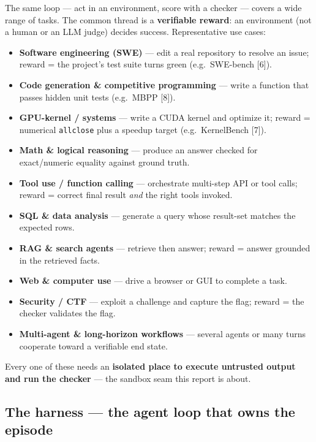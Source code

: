 \documentclass[
  paper=a4,
  ,captions=tableheading
]{scrartcl}
\providecommand{\tightlist}{%
  \setlength{\itemsep}{0pt}\setlength{\parskip}{0pt}}
\begin{document}
The same loop --- act in an environment, score with a checker --- covers
a wide range of tasks. The common thread is a \textbf{verifiable
reward}: an environment (not a human or an LLM judge) decides success.
Representative use cases:

\begin{itemize}
\tightlist
\item
  \textbf{Software engineering (SWE)} --- edit a real repository to
  resolve an issue; reward = the project's test suite turns green
  (e.g.~SWE-bench {[}6{]}).
\item
  \textbf{Code generation \& competitive programming} --- write a
  function that passes hidden unit tests (e.g.~MBPP {[}8{]}).
\item
  \textbf{GPU-kernel / systems} --- write a CUDA kernel and optimize it;
  reward = numerical \texttt{allclose} plus a speedup target
  (e.g.~KernelBench {[}7{]}).
\item
  \textbf{Math \& logical reasoning} --- produce an answer checked for
  exact/numeric equality against ground truth.
\item
  \textbf{Tool use / function calling} --- orchestrate multi-step API or
  tool calls; reward = correct final result \emph{and} the right tools
  invoked.
\item
  \textbf{SQL \& data analysis} --- generate a query whose result-set
  matches the expected rows.
\item
  \textbf{RAG \& search agents} --- retrieve then answer; reward =
  answer grounded in the retrieved facts.
\item
  \textbf{Web \& computer use} --- drive a browser or GUI to complete a
  task.
\item
  \textbf{Security / CTF} --- exploit a challenge and capture the flag;
  reward = the checker validates the flag.
\item
  \textbf{Multi-agent \& long-horizon workflows} --- several agents or
  many turns cooperate toward a verifiable end state.
\end{itemize}

Every one of these needs an \textbf{isolated place to execute untrusted
output and run the checker} --- the sandbox seam this report is about.

\hypertarget{the-harness-the-agent-loop-that-owns-the-episode}{%
\subsection{The harness --- the agent loop that owns the
episode}\label{the-harness-the-agent-loop-that-owns-the-episode}}
\end{document}
